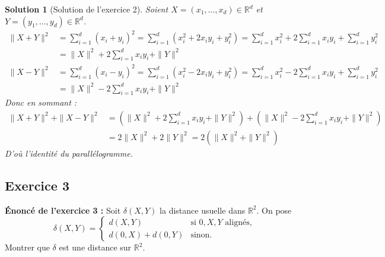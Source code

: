 \documentclass{article}
\newtheorem{solution}{Solution}
\begin{document}
\begin{solution}[Solution de l'exercice 2]
Soient $X = (x_1, \dots, x_d) \in \mathbb{R}^d$ et $Y = (y_1, \dots, y_d) \in \mathbb{R}^d$.
\begin{align*}
\|X + Y\|^2 &= \sum_{i=1}^d (x_i + y_i)^2 = \sum_{i=1}^d (x_i^2 + 2x_i y_i + y_i^2) = \sum_{i=1}^d x_i^2 + 2 \sum_{i=1}^d x_i y_i + \sum_{i=1}^d y_i^2 \\
&= \|X\|^2 + 2 \sum_{i=1}^d x_i y_i + \|Y\|^2
\end{align*}
\begin{align*}
\|X - Y\|^2 &= \sum_{i=1}^d (x_i - y_i)^2 = \sum_{i=1}^d (x_i^2 - 2x_i y_i + y_i^2) = \sum_{i=1}^d x_i^2 - 2 \sum_{i=1}^d x_i y_i + \sum_{i=1}^d y_i^2 \\
&= \|X\|^2 - 2 \sum_{i=1}^d x_i y_i + \|Y\|^2
\end{align*}
Donc en sommant :
\begin{align*}
\|X + Y\|^2 + \|X - Y\|^2 &= (\|X\|^2 + 2 \sum_{i=1}^d x_i y_i + \|Y\|^2) + (\|X\|^2 - 2 \sum_{i=1}^d x_i y_i + \|Y\|^2) \\
&= 2\|X\|^2 + 2\|Y\|^2 = 2(\|X\|^2 + \|Y\|^2)
\end{align*}
D'où l'identité du parallélogramme.
\end{solution}

\subsection{Exercice 3}

\textbf{Énoncé de l'exercice 3 :}
Soit $\delta(X, Y)$ la distance usuelle dans $\mathbb{R}^2$. On pose
\[
\delta(X, Y) = \begin{cases}
d(X, Y) & \text{si } 0, X, Y \text{ alignés,} \\
d(0, X) + d(0, Y) & \text{sinon.}
\end{cases}
\]
Montrer que $\delta$ est une distance sur $\mathbb{R}^2$.
\end{document}
